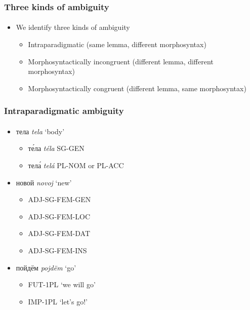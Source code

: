 \documentclass{beamer}
\newcommand{\rus}[1]{\foreignlanguage{russian}{#1}}
\begin{document}
\begin{frame}
\frametitle{Three kinds of ambiguity}
\framesubtitle{}
\begin{itemize}
	\item We identify three kinds of ambiguity
	\begin{itemize}
		\item Intraparadigmatic (same lemma, different morphosyntax)
		\item Morphosyntactically incongruent (different lemma, different morphosyntax)		
		\item Morphosyntactically congruent (different lemma, same morphosyntax)
	\end{itemize}
\end{itemize}
\end{frame}

\begin{frame}
\frametitle{Intraparadigmatic ambiguity}
\framesubtitle{}
\begin{itemize}
	\item \rus{тела} \emph{tela} `body'
	\begin{itemize}
		\item \rus{т\'{е}ла} \emph{téla} SG-GEN
		\item \rus{тел\'{а}} \emph{telá} PL-NOM or PL-ACC
	\end{itemize}
	\pause
	\item \rus{новой} \emph{novoj} `new'
	\begin{itemize}
		\item ADJ-SG-FEM-GEN
		\item ADJ-SG-FEM-LOC
		\item ADJ-SG-FEM-DAT
		\item ADJ-SG-FEM-INS
	\end{itemize}
	\pause
	\item \rus{пойдём} \emph{pojdëm} `go'
	\begin{itemize}
		\item FUT-1PL `we will go'
		\item IMP-1PL `let's go!'
	\end{itemize}
\end{itemize}
\end{frame}
\end{document}
